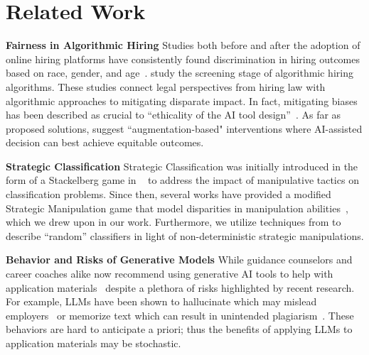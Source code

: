 \section{Related Work}
\label{sec: related work}

\textbf{Fairness in Algorithmic Hiring} Studies both before and after the adoption of online hiring platforms have consistently found discrimination in hiring outcomes based on race, gender, and age~\citep{bertrand2004emily, kline2022systemic}.  \cite{raghavan2020mitigating} study the screening stage of algorithmic hiring algorithms. These studies connect legal perspectives from hiring law with algorithmic approaches to mitigating disparate impact. In fact, mitigating biases has been described as crucial to ``ethicality of the AI tool design''~\citep{hunkenschroer2022ethics}. As far as proposed solutions, \cite{lin2021engineering} suggest ``augmentation-based" interventions where AI-assisted decision can best achieve equitable outcomes. 

\textbf{Strategic Classification}
Strategic Classification was initially introduced in the form of a Stackelberg game in ~\cite{Hardt2015} to address the impact of manipulative tactics on classification problems. Since then, several works have provided a modified Strategic Manipulation game that model disparities in manipulation abilities~\citep{Hu2019, milli2019social, chen2020strategic}, which we drew upon in our work. Furthermore, we utilize techniques from \cite{Braverman2020} to describe ``random'' classifiers in light of non-deterministic strategic manipulations. 

\textbf{Behavior and Risks of Generative Models} While guidance counselors and career coaches alike now recommend using generative AI tools to help with application materials~\citep{Verma_Renjarla_2024, Chamorro_2024} despite a plethora of risks highlighted by recent research. For example, LLMs have been shown to hallucinate which may mislead employers~\citep{huang2023survey} or memorize text which can result in unintended plagiarism~\citep{carlini2022quantifying}. These behaviors are hard to anticipate a priori; thus the benefits of applying LLMs to application materials may be stochastic. 




